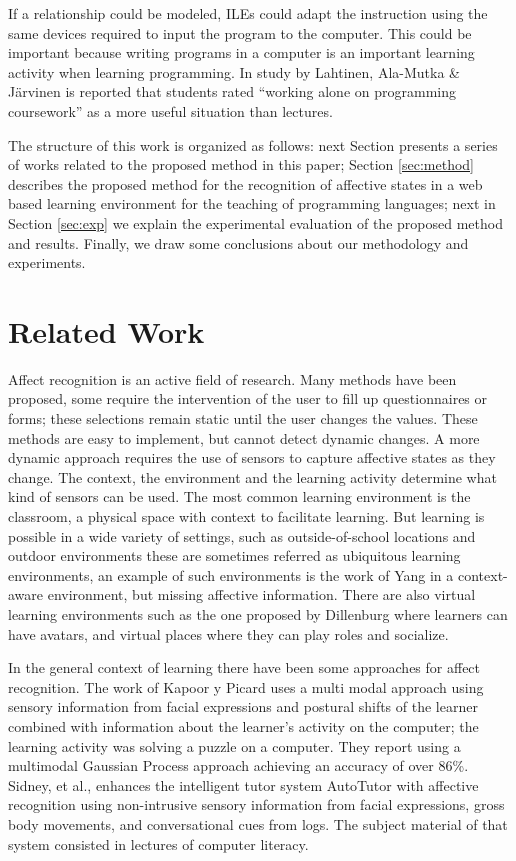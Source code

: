 \documentclass[a4paper,twoside]{article}
\begin{document}
If a relationship could be modeled, ILEs could adapt the instruction using the
same devices required to input the program to the computer. This could be
important because writing programs in a computer is an important learning
activity when learning programming. In study by Lahtinen, Ala-Mutka \& Järvinen
\cite{lahtinen2005study} is reported that students rated ``working alone on programming
coursework'' as a more useful situation than lectures.

The structure of this work is organized as follows: next Section 
presents a series of works related to the proposed method in this paper; Section
\ref{sec:method} describes the proposed method for the recognition of affective
states in a web based learning environment for the teaching of programming
languages; next in Section \ref{sec:exp} we explain the experimental evaluation of the
proposed method and results.
Finally, we draw some conclusions about our methodology and
experiments. 


\section{Related Work}

Affect recognition is an active field of research. Many
methods have been proposed, some require the intervention of the user to fill up
questionnaires or forms; these selections remain static until the user changes
the values. These methods are easy to implement, but cannot detect dynamic
changes.  A more dynamic approach requires the use of sensors to capture
affective states as they change. The context, the environment and the learning
activity determine what kind of sensors can be used. The most common learning
environment is the classroom, a physical space with context to facilitate
learning. But learning is possible in a wide variety of settings, such as
outside-of-school locations and outdoor environments these are sometimes
referred as ubiquitous learning environments, an example of such environments is
the work of Yang \cite{yang2006context} in a context-aware environment, but missing affective
information. There are also virtual learning environments such as the one proposed by Dillenburg
\cite{dillenbourg2002virtual}  where learners can have avatars, and virtual places
where they can play roles and socialize.

In the general context of learning there have been some approaches for affect
recognition. The work of Kapoor y Picard \cite{kapoor2005multimodal} uses a multi modal
approach using sensory information from facial expressions and postural shifts
of the learner combined with information about the learner's activity on the
computer; the learning activity was solving a puzzle on a computer. They report
using a multimodal Gaussian Process approach achieving an accuracy of over 86\%.
Sidney, et al., \cite{sidney2005integrating} enhances the intelligent tutor system AutoTutor with
affective recognition using non-intrusive sensory information from facial
expressions, gross body movements, and conversational cues from logs.  The
subject material of that system consisted in lectures of computer
literacy.
\end{document}
